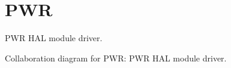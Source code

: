 \hypertarget{group__PWR}{}\section{P\+WR}
\label{group__PWR}


P\+WR H\+AL module driver.  


Collaboration diagram for P\+WR\+:
P\+WR H\+AL module driver. 

